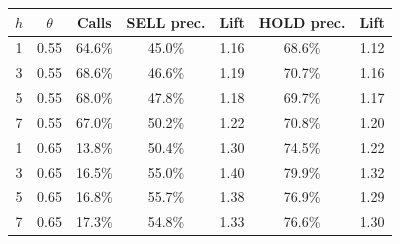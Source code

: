 \begin{tabular}{ccccccc}
\toprule
$h$ & $\theta$ & Calls & SELL prec. & Lift & HOLD prec. & Lift\\
\midrule
1 & 0.55 & 64.6\% & 45.0\% & 1.16 & 68.6\% & 1.12\\
3 & 0.55 & 68.6\% & 46.6\% & 1.19 & 70.7\% & 1.16\\
5 & 0.55 & 68.0\% & 47.8\% & 1.18 & 69.7\% & 1.17\\
7 & 0.55 & 67.0\% & 50.2\% & 1.22 & 70.8\% & 1.20\\
\midrule
1 & 0.65 & 13.8\% & 50.4\% & 1.30 & 74.5\% & 1.22\\
3 & 0.65 & 16.5\% & 55.0\% & 1.40 & 79.9\% & 1.32\\
5 & 0.65 & 16.8\% & 55.7\% & 1.38 & 76.9\% & 1.29\\
7 & 0.65 & 17.3\% & 54.8\% & 1.33 & 76.6\% & 1.30\\
\bottomrule
\end{tabular}
